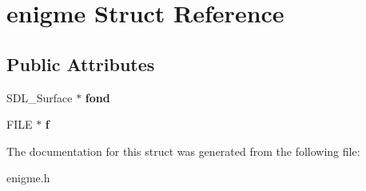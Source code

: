 \hypertarget{structenigme}{}\section{enigme Struct Reference}
\label{structenigme}
\subsection*{Public Attributes}
\begin{DoxyCompactItemize}
\item 
\mbox{\label{structenigme_a0a53a21d5fa8a66dd6cece93a3d4dedf}} 
S\+D\+L\+\_\+\+Surface $\ast$ {\bfseries fond}
\item 
\mbox{\label{structenigme_a9ce33d500de045fd29a8aa61c2fc0e1f}} 
F\+I\+LE $\ast$ {\bfseries f}
\end{DoxyCompactItemize}


The documentation for this struct was generated from the following file\+:\begin{DoxyCompactItemize}
\item 
enigme.\+h\end{DoxyCompactItemize}

